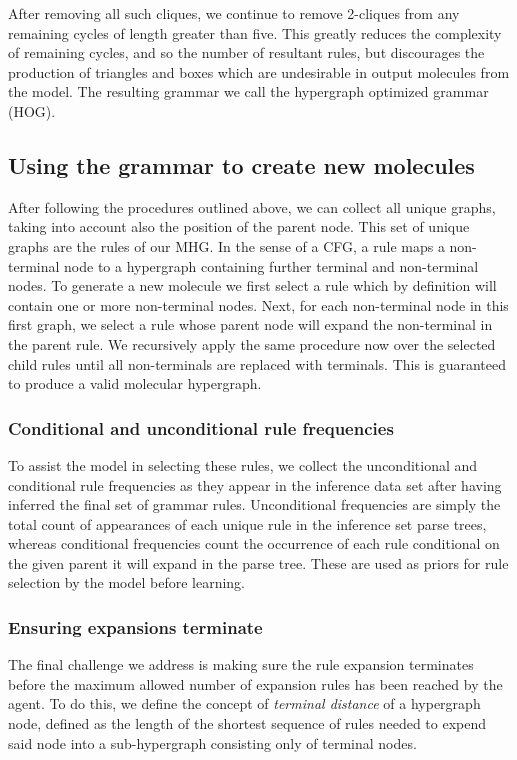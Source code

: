 \documentclass{article}
\begin{document}
After removing all such cliques, we continue to remove 2-cliques from any remaining cycles of length greater than five. This greatly reduces the complexity of remaining cycles, and so the number of resultant rules, but discourages the production of triangles and boxes which are undesirable in output molecules from the model. The resulting grammar we call the hypergraph optimized grammar (HOG).

\subsection{Using the grammar to create new molecules}\label{sec:grammar_usage}
After following the procedures outlined above, we can collect all unique graphs, taking into account also the position of the parent node. This set of unique graphs are the rules of our MHG. In the sense of a CFG, a rule maps a non-terminal node to a hypergraph containing further terminal and non-terminal nodes. To generate a new molecule we first select a rule which by definition will contain one or more non-terminal nodes. Next, for each non-terminal node in this first graph, we select a rule whose parent node will expand the non-terminal in the parent rule. We recursively apply the same procedure now over the selected child rules until all non-terminals are replaced with terminals. This is guaranteed to produce a valid molecular hypergraph.

\subsubsection{Conditional and unconditional rule frequencies}\label{sec:freq}
To assist the model in selecting these rules, we collect the unconditional and conditional rule frequencies as they appear in the inference data set after having inferred the final set of grammar rules. Unconditional frequencies are simply the total count of appearances of each unique rule in the inference set parse trees, whereas conditional frequencies count the occurrence of each rule conditional on the given parent it will expand in the parse tree. These are used as priors for rule selection by the model before learning.

\subsubsection{Ensuring expansions terminate}\label{sec:termination}
The final challenge we address is making sure the rule expansion terminates before the maximum allowed number of expansion rules has been reached by the agent. To do this, we define the concept of \emph{terminal distance} of a hypergraph node, defined as the length of the shortest sequence of rules needed to expend said node into a sub-hypergraph consisting only of terminal nodes. 
\end{document}

